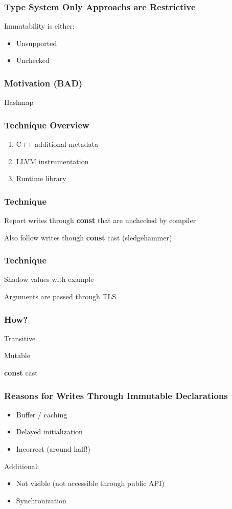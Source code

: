 \documentclass[aspectratio=169]{beamer}
\newcommand{\const}{{\color{blue} \bfseries \ttfamily const}}
\begin{document}
  \begin{frame}
    \frametitle{Type System Only Approachs are Restrictive}
    \Large
    Immutability is either:

    \begin{itemize}
      \item Unsupported
      \item Unchecked
    \end{itemize}
  \end{frame}

  \begin{frame}
    \frametitle{Motivation (BAD)}
    \Large
    Hashmap
  \end{frame}

  \begin{frame}
    \frametitle{Technique Overview}

    \begin{enumerate}
      \item C++ additional metadata
      \item LLVM instrumentation
      \item Runtime library
    \end{enumerate}
  \end{frame}

  \begin{frame}
    \frametitle{Technique}
    \Large
    Report writes through \const{} that are unchecked by compiler

    Also follow writes though \const{} cast (sledgehammer)
  \end{frame}

  \begin{frame}
    \frametitle{Technique}
    \Large
    Shadow values with example

    Arguments are passed through TLS
  \end{frame}

  \begin{frame}
    \frametitle{How?}
    \Large

    Transitive

    Mutable

    \const{} cast
  \end{frame}

  \begin{frame}
    \frametitle{Reasons for Writes Through Immutable Declarations}
    \Large
    \begin{itemize}
      \item Buffer / caching
      \item Delayed initialization
      \item Incorrect (around {\color{blue} half}!)
    \end{itemize}

    Additional:
    \begin{itemize}
      \item Not visible (not accessible through public API)
      \item Synchronization
    \end{itemize}
  \end{frame}
\end{document}
